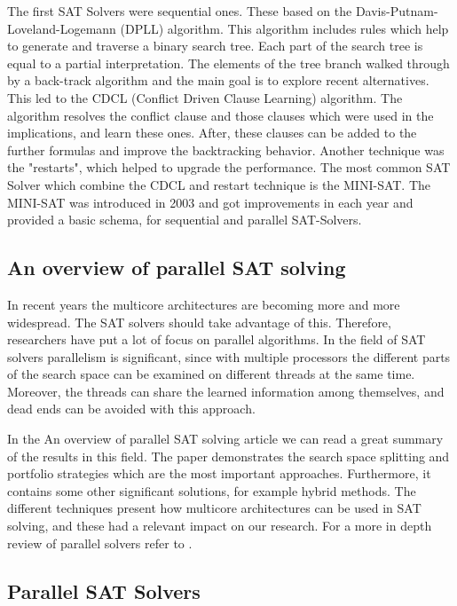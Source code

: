 \documentclass{article}
\begin{document}
The first SAT Solvers were sequential ones. These based on the Davis-Putnam-Loveland-Logemann (DPLL) algorithm. This algorithm includes rules which help to generate and traverse a binary search tree. Each part of the search tree is equal to a partial interpretation. The elements of the tree branch walked through by a back-track algorithm and the main goal is to explore recent alternatives. This led to the CDCL (Conflict Driven Clause Learning) algorithm. The algorithm resolves the conflict clause and those clauses which were used in the implications, and learn these ones. After, these clauses can be added to the further formulas and improve the backtracking behavior. Another technique was the "restarts", which helped to upgrade the performance. The most common SAT Solver which combine the CDCL and restart technique is the MINI-SAT. The MINI-SAT was introduced in 2003 and got improvements in each year and provided a basic schema, for sequential and parallel SAT-Solvers.\cite{OverviewSAT}


\subsection{An overview of parallel SAT solving}

In recent years the multicore architectures are becoming more and more wide\-spread. The SAT solvers should take advantage of this. Therefore, researchers have put a lot of focus on parallel algorithms.
In the field of SAT solvers parallelism is significant, since with multiple processors the different parts of the search space can be examined on different threads at the same time. Moreover, the threads can share the learned information among themselves, and dead ends can be avoided with this approach.


In the An overview of parallel SAT solving article we can read a great summary of the results in this field. The paper demonstrates the search space splitting and portfolio strategies which are the most important approaches. Furthermore, it contains some other significant solutions, for example hybrid methods. The different techniques present how multicore architectures can be used in SAT solving, and these had a relevant impact on our research. For a more in depth review of parallel solvers refer to \cite{paralellSAT}.


\subsection{Parallel SAT Solvers}
\end{document}
